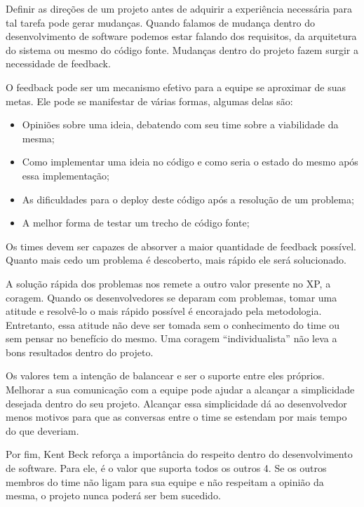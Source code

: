 Definir as direções de um projeto antes de adquirir a experiência necessária para tal tarefa pode gerar mudanças. Quando falamos de mudança dentro do desenvolvimento de software podemos estar falando dos requisitos, da arquitetura do sistema ou mesmo do código fonte. Mudanças dentro do projeto fazem surgir a necessidade de feedback.

O feedback pode ser um mecanismo efetivo para a equipe se aproximar de suas metas. Ele pode se manifestar de várias formas, algumas delas são:

\begin{itemize}

\item Opiniões sobre uma ideia, debatendo com seu time sobre a viabilidade da mesma;

\item Como implementar uma ideia no código e como seria o estado do mesmo após essa implementação;

\item As dificuldades para o deploy deste código após a resolução de um problema;

\item A melhor forma de testar um trecho de código fonte;

\end{itemize}

Os times devem ser capazes de absorver a maior quantidade de feedback possível. Quanto mais cedo um problema é descoberto, mais rápido ele será solucionado.

A solução rápida dos problemas nos remete a outro valor presente no XP, a coragem. Quando os desenvolvedores se deparam com problemas, tomar uma atitude e resolvê-lo o mais rápido possível é encorajado pela metodologia. Entretanto, essa atitude não deve ser tomada sem o conhecimento do time ou sem pensar no benefício do mesmo. Uma coragem “individualista” não leva a bons resultados dentro do projeto.

Os valores tem a intenção de balancear e ser o suporte entre eles próprios. Melhorar a sua comunicação com a equipe pode ajudar a alcançar a simplicidade desejada dentro do seu projeto. Alcançar essa simplicidade dá ao desenvolvedor menos motivos para que as conversas entre o time se estendam por mais tempo do que deveriam.

Por fim, Kent Beck reforça a importância do respeito dentro do desenvolvimento de software. Para ele, é o valor que suporta todos os outros 4. Se os outros membros do time não ligam para sua equipe e não respeitam a opinião da mesma, o projeto nunca poderá ser bem sucedido.

